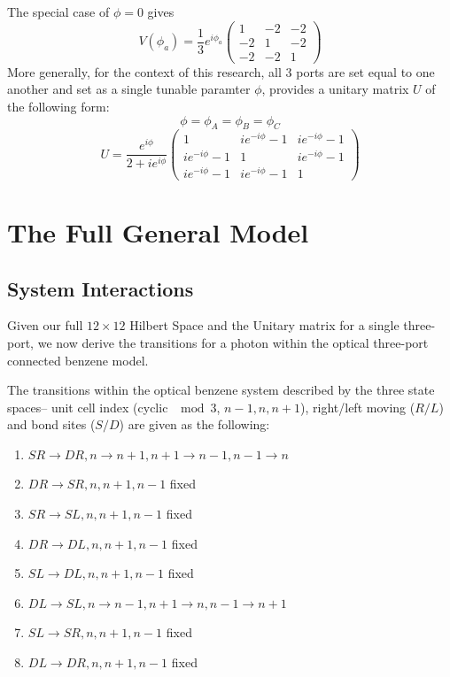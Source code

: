 The special case of $\phi = 0$ gives
\begin{equation}
    V(\phi_{a}) = \frac{1}{3}e^{i\phi_{a}} 
    \begin{pmatrix}
    1 & -2 & -2 \\
    -2 & 1 & -2 \\
    -2 & -2 & 1 \end{pmatrix}
\end{equation} 
More generally, for the context of this research, all 3 ports are set equal to one another and set as a single tunable paramter $\phi$, provides a unitary matrix $U$ of the following form: 
\begin{equation}
    \phi = \phi_{A} = \phi_{B} = \phi_{C}
\end{equation}
\begin{equation}
    U = \frac{e^{i\phi}}{2+ie^{i\phi}}
    \begin{pmatrix}
    1 & ie^{-i\phi} - 1 & ie^{-i\phi} - 1 \\
    ie^{-i\phi} - 1 & 1 & ie^{-i\phi} - 1 \\
    ie^{-i\phi} - 1 & ie^{-i\phi} - 1 & 1 \end{pmatrix}
\end{equation}
 
 
\section{The Full General Model}
\subsection{System Interactions}
Given our full $12 \times 12$ Hilbert Space and the Unitary matrix for a single three-port, we now derive the transitions for a photon within the optical three-port connected benzene model. \newline

The transitions within the optical benzene system described by the three state spaces-- unit cell index (cyclic $\mod 3$, $n-1, n, n+1$), right/left moving ($R/L$) and bond sites ($S/D$) are given as the following: 

\begin{enumerate}
    \item $SR \rightarrow DR,  n \rightarrow n + 1, n+1 \rightarrow n-1 , n-1 \rightarrow n$
    \item $DR \rightarrow SR, n, n+1, n-1$ fixed
    \item $SR \rightarrow SL, n , n+1, n-1$ fixed
    \item $DR \rightarrow DL , n , n+1, n-1$ fixed
    \item $SL \rightarrow DL, n, n+1, n-1$ fixed
    \item $DL \rightarrow SL, n \rightarrow n-1, n+1 \rightarrow n, n-1\rightarrow n+1$
    \item $SL \rightarrow SR, n, n+1, n-1$ fixed
    \item $DL \rightarrow DR, n, n+1, n-1$ fixed
\end{enumerate}

